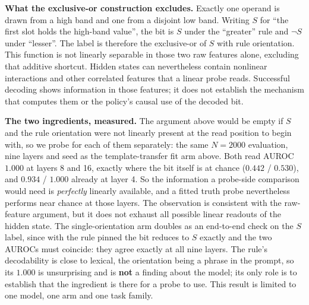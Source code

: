 \documentclass{article}
\begin{document}
\textbf{What the exclusive-or construction excludes.} Exactly one operand is drawn from a high band and one from a disjoint low band. Writing $S$ for ``the first slot holds the high-band value'', the bit is $S$ under the ``greater'' rule and $\lnot S$ under ``lesser''. The label is therefore the exclusive-or of $S$ with rule orientation. This function is not linearly separable in those two raw features alone, excluding that additive shortcut. Hidden states can nevertheless contain nonlinear interactions and other correlated features that a linear probe reads. Successful decoding shows information in those features; it does not establish the mechanism that computes them or the policy's causal use of the decoded bit.

\textbf{The two ingredients, measured.} The argument above
would be empty if $S$ and the rule orientation were not linearly present at the read position to begin
with, so we probe for each of them separately: the same $N{=}2000$ evaluation, nine layers and seed as the template-transfer fit arm above. Both read AUROC $1.000$ at layers 8 and 16, exactly where the bit itself
is at chance ($0.442$ / $0.530$), and $0.934$ / $1.000$ already at layer 4. So the information a
probe-side comparison would need is \emph{perfectly} linearly available, and a
fitted truth probe nevertheless performs near chance at those layers. The observation is consistent with the raw-feature argument, but it does not exhaust all possible linear readouts of the hidden state. The single-orientation arm doubles as an
end-to-end check on the $S$ label, since with the rule pinned the bit reduces to $S$ exactly and the two AUROCs must coincide: they agree exactly at all nine layers. The rule's decodability is close to lexical, the orientation being a phrase in the prompt, so
its $1.000$ is unsurprising and is \textbf{not} a finding about the model; its only role is to establish
that the ingredient is there for a probe to use. This result is limited to one model, one arm and one task
family.
\end{document}
